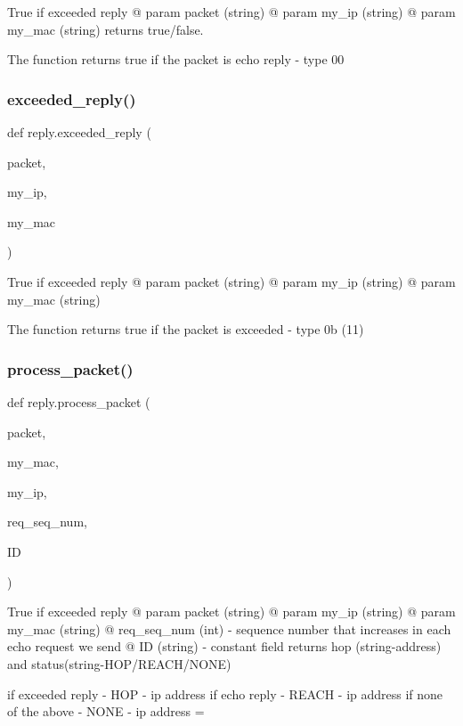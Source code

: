 True if exceeded reply @ param packet (string) @ param my\+\_\+ip (string) @ param my\+\_\+mac (string) returns true/false. 

The function returns true if the packet is echo reply -\/ type \textquotesingle{}00\textquotesingle{} \mbox{\label{namespacereply_ad152c5c2603b1c92f0ef5c5760e62e7d}} 
\subsubsection{\texorpdfstring{exceeded\+\_\+reply()}{exceeded\_reply()}}
{\footnotesize\ttfamily def reply.\+exceeded\+\_\+reply (\begin{DoxyParamCaption}\item[{}]{packet,  }\item[{}]{my\+\_\+ip,  }\item[{}]{my\+\_\+mac }\end{DoxyParamCaption})}



True if exceeded reply @ param packet (string) @ param my\+\_\+ip (string) @ param my\+\_\+mac (string) 

The function returns true if the packet is exceeded -\/ type \textquotesingle{}0b\textquotesingle{} (11) \mbox{\label{namespacereply_adb013751d024e7ccadaaffaf62a5cf39}} 
\subsubsection{\texorpdfstring{process\+\_\+packet()}{process\_packet()}}
{\footnotesize\ttfamily def reply.\+process\+\_\+packet (\begin{DoxyParamCaption}\item[{}]{packet,  }\item[{}]{my\+\_\+mac,  }\item[{}]{my\+\_\+ip,  }\item[{}]{req\+\_\+seq\+\_\+num,  }\item[{}]{ID }\end{DoxyParamCaption})}



True if exceeded reply @ param packet (string) @ param my\+\_\+ip (string) @ param my\+\_\+mac (string) @ req\+\_\+seq\+\_\+num (int) -\/ sequence number that increases in each echo request we send @ ID (string) -\/ constant field returns hop (string-\/address) and status(string-\/\+H\+O\+P/\+R\+E\+A\+C\+H/\+N\+O\+NE) 

if exceeded reply -\/ H\+OP -\/ ip address if echo reply -\/ R\+E\+A\+CH -\/ ip address if none of the above -\/ N\+O\+NE -\/ ip address = \textquotesingle{}\textquotesingle{} 